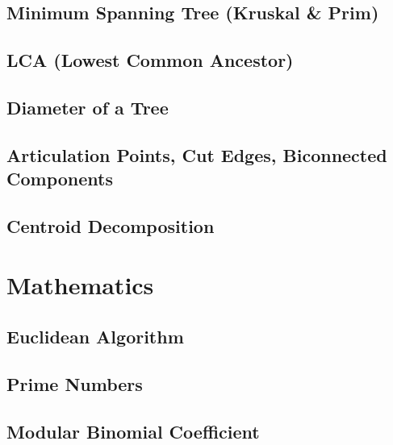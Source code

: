 \documentclass[10pt,landscape,twocolumn,a4paper,notitlepage]{article}
\begin{document}
  \subsection{Minimum Spanning Tree (Kruskal \& Prim)}
  

  \subsection{LCA (Lowest Common Ancestor)}
  

  \subsection{Diameter of a Tree}
  

  \subsection{Articulation Points, Cut Edges, Biconnected Components}
  
  
  \subsection{Centroid Decomposition}
  

\section{Mathematics}

  \subsection{Euclidean Algorithm}
  

  \subsection{Prime Numbers}
  
  
  \subsection{Modular Binomial Coefficient}
  
\end{document}
